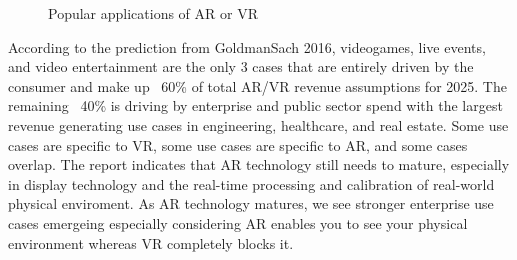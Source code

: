 \documentclass[preprint,12pt]{elsarticle}
\begin{document}
\begin{figure}[!hbp]
{    }
	\caption{Popular applications of AR or VR}
	\label{AR VR applications}
\end{figure}

According to the prediction from GoldmanSach 2016, videogames, live events, and video entertainment are the only 3 cases that are entirely driven by the consumer and make up ~60\% of total AR/VR revenue assumptions for 2025. The remaining ~40\% is driving by enterprise and public sector spend with the largest revenue generating use cases in engineering, healthcare, and real estate. Some use cases are specific to VR, some use cases are specific to AR, and some cases overlap. The report indicates that AR technology still needs to mature, especially in display technology and the real-time processing and calibration of real-world physical enviroment. As AR technology matures, we see stronger enterprise use cases emergeing especially considering AR enables you to see your physical environment whereas VR completely blocks it.
\end{document}
